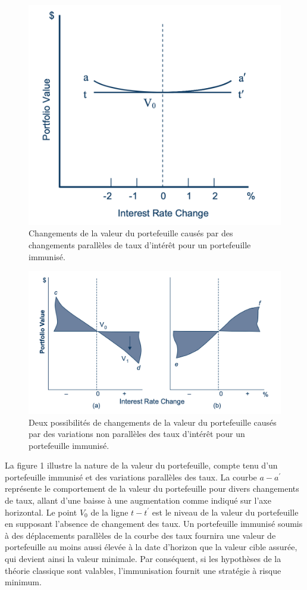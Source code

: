 \documentclass[12pt]{article}
\begin{document}
\begin{figure}[H]
\caption{Changements de la valeur du portefeuille causés par des changements parallèles de taux d'intérêt pour un portefeuille immunisé.}
\centering
\includegraphics[width=12cm]{1}
\end{figure}

\begin{figure}[H]
\caption{Deux possibilités de changements de la valeur du portefeuille causés par des variations non parallèles des taux d'intérêt pour un portefeuille immunisé.}
\centering
\includegraphics[width=14cm]{2}
\end{figure}

La figure 1 illustre la nature de la valeur du portefeuille, compte tenu d'un portefeuille immunisé et des variations parallèles des taux. La courbe $a-a^'$ représente le comportement de la valeur du portefeuille pour divers changements de taux, allant d'une baisse à une augmentation comme indiqué sur l'axe horizontal. Le point $V_0$ de la ligne $t-t^'$ est le niveau de la valeur du portefeuille en supposant l'absence de changement des taux.  Un portefeuille immunisé soumis à des déplacements parallèles de la courbe des taux fournira une valeur de portefeuille au moins aussi élevée à la date d'horizon que la valeur cible assurée, qui devient ainsi la valeur minimale. Par conséquent, si les hypothèses de la théorie classique sont valables, l'immunisation fournit une stratégie à risque minimum.
\end{document}
